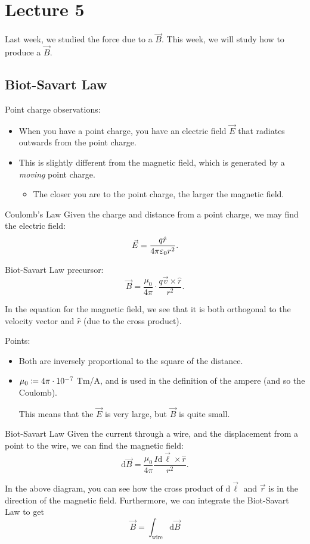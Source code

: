 \documentclass[class=article, crop=false]{standalone}
\begin{document}
  \section{Lecture 5}
  Last week, we studied the force due to a $\vec{B}$. This week, we will study how to produce a $\vec{B}$.
  \subsection{Biot-Savart Law}
  Point charge observations:
  \begin{itemize}
    \item When you have a point charge, you have an electric field $\vec{E}$ that radiates outwards from the point charge.
    \item This is slightly different from the magnetic field, which is generated by a \emph{moving} point charge.
    \begin{itemize}
      \item The closer you are to the point charge, the larger the magnetic field.
    \end{itemize}
  \end{itemize}
  \begin{theorem}{Coulomb's Law}
    Given the charge and distance from a point charge, we may find the electric field:
    \[
      \vec{E} = \frac{q\hat{r}}{4\pi\varepsilon_0r^2}.
    \]
  \end{theorem}
  Biot-Savart Law precursor:
  \[
    \vec{B} = \frac{\mu_0}{4\pi}\cdot \frac{q\vec{v}\times\hat{r}}{r^2}.
  \]
  \begin{note}{}
    In the equation for the magnetic field, we see that it is both orthogonal to the velocity vector and $\hat{r}$ (due to the cross product).
  \end{note}
  Points:
  \begin{itemize}
    \item Both are inversely proportional to the square of the distance.
    \item $\mu_0 \coloneqq 4\pi\cdot 10^{-7}$ Tm/A, and is used in the definition of the ampere (and so the Coulomb).
    \begin{note}{}
      This means that the $\vec{E}$ is very large, but $\vec{B}$ is quite small.
    \end{note}
  \end{itemize}
  \begin{theorem}{Biot-Savart Law}
    Given the current through a wire, and the displacement from a point to the wire, we can find the magnetic field:
    \[
      \mathrm{d}\vec{B} = \frac{\mu_0}{4\pi} \frac{I\mathrm{d}\vec{\ell}\times\hat{r}}{r^2}.
    \]
  \end{theorem}
  \begin{center}\end{center}
  In the above diagram, you can see how the cross product of $\mathrm{d}\vec{\ell}$ and $\vec{r}$ is in the direction of the magnetic field. Furthermore, we can integrate the Biot-Savart Law to get
  \[
    \vec{B} = \int_\text{wire} \mathrm{d}\vec{B}
  \]
\end{document}

